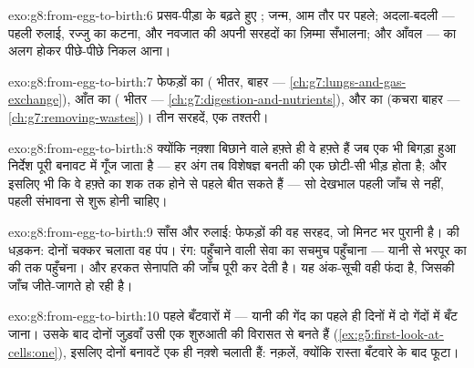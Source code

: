 \begin{solution}{exo:g8:from-egg-to-birth:6}
प्रसव-पीड़ा के बढ़ते हुए ; जन्म, आम तौर पर  पहले; अदला-बदली ---
पहली रुलाई, रज्जु का कटना, और नवजात की अपनी सरहदों का ज़िम्मा सँभालना;
और आँवल ---  का अलग होकर पीछे-पीछे निकल आना।
\end{solution}

\begin{solution}{exo:g8:from-egg-to-birth:7}
फेफड़ों का ( भीतर,  बाहर ---
\cref{ch:g7:lungs-and-gas-exchange}), आँत का ( भीतर ---
\cref{ch:g7:digestion-and-nutrients}), और  का (कचरा बाहर ---
\cref{ch:g7:removing-wastes})। तीन सरहदें, एक तश्तरी।
\end{solution}

\begin{solution}{exo:g8:from-egg-to-birth:8}
क्योंकि नक़्शा बिछाने वाले हफ़्ते ही वे हफ़्ते हैं जब एक भी बिगड़ा हुआ
निर्देश पूरी बनावट में गूँज जाता है --- हर अंग तब विशेषज्ञ बनती
 की एक छोटी-सी भीड़ होता है; और इसलिए भी कि वे हफ़्ते
 का शक तक होने से पहले बीत सकते हैं --- सो देखभाल पहली जाँच
से नहीं, पहली संभावना से शुरू होनी चाहिए।
\end{solution}

\begin{solution}{exo:g8:from-egg-to-birth:9}
साँस और रुलाई: फेफड़ों की वह सरहद, जो मिनट भर पुरानी है।  की धड़कन:
दोनों चक्कर चलाता वह पंप। रंग: पहुँचाने वाली सेवा का सचमुच पहुँचाना ---
यानी  से भरपूर  का  की  तक पहुँचना। और हरकत
सेनापति की जाँच पूरी कर देती है। यह अंक-सूची वही फंदा है, जिसकी जाँच
जीते-जागते हो रही है।
\end{solution}

\begin{solution}{exo:g8:from-egg-to-birth:10}
पहले बँटवारों में --- यानी  की गेंद का पहले ही दिनों में दो गेंदों
में बँट जाना। उसके बाद दोनों जुड़वाँ उसी एक शुरुआती  की विरासत से
बनते हैं (\cref{ex:g5:first-look-at-cells:one}), इसलिए दोनों बनावटें
एक ही नक़्शे चलाती हैं: नक़लें, क्योंकि रास्ता बँटवारे के बाद फूटा।
\end{solution}

